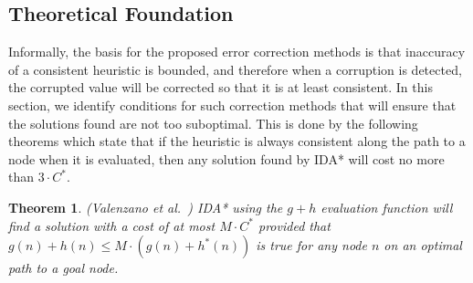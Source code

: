 \documentclass[letterpaper]{article}
\newtheorem{theorem}{Theorem}
\newtheorem{definition}{Definition}
\begin{document}


\subsection{Theoretical Foundation}
Informally, the basis for the proposed error correction methods is that inaccuracy of a consistent heuristic is bounded, and therefore when a corruption is detected,
the corrupted value will be corrected so that it is at least consistent.
In this section, we identify conditions for such correction methods that will ensure that the solutions found are not too suboptimal.
This is done by the following theorems which state that if the heuristic is always consistent along the path to a node when it is evaluated, then any solution found by IDA* will cost no more than $3 \cdot C^*$.


\begin{theorem} (Valenzano et al.~)
IDA* using the $g+h$ evaluation function will find a solution with a cost of at most $M\cdot C^*$ provided that $g(n) + h(n) \leq M \cdot (g(n)+h^*(n))$ is true for any node $n$ on an optimal path to a goal node. %
\label{theorem:rickmas}
\end{theorem}
\end{document}

